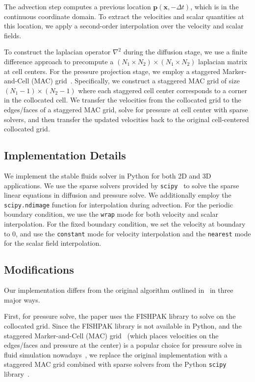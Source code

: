 \documentclass[sigconf]{acmart}
\begin{document}
The advection step computes a previous location $\mathbf{p}(\mathbf{x}, -\Delta t)$, which is in the continuous coordinate domain. To extract the velocities and scalar quantities at this location, we apply a second-order interpolation over the velocity and scalar fields.

To construct the laplacian operator $\nabla^2$ during the diffusion stage, we use a finite difference approach to precompute a $(N_1\times N_2)\times(N_1\times N_2)$ laplacian matrix at cell centers. For the pressure projection stage, we employ a staggered Marker-and-Cell (MAC) grid~\cite{harlow1965MAC}. Specifically, we construct a staggered MAC grid of size $(N_1 - 1)\times(N_2 - 1)$ where each staggered cell center corresponds to a corner in the collocated cell. We transfer the velocities from the collocated grid to the edges/faces of a staggered MAC grid, solve for pressure at cell center with sparse solvers, and then transfer the updated velocities back to the original cell-centered collocated grid.

\subsection{Implementation Details}
We implement the stable fluids solver in Python for both 2D and 3D applications. We use the sparse solvers provided by \texttt{scipy}~\cite{scipy} to solve the sparse linear equations in diffusion and pressure solve. We additionally employ the \texttt{scipy.ndimage} function for interpolation during advection. For the periodic boundary condition, we use the \texttt{wrap} mode for both velocity and scalar interpolation. For the fixed boundary condition, we set the velocity at boundary to 0, and use the \texttt{constant} mode for velocity interpolation and the \texttt{nearest} mode for the scalar field interpolation.

\subsection{Modifications}
Our implementation differs from the original algorithm outlined in~\cite{Stam1999Fluid} in three major ways.

First, for pressure solve, the paper uses the FISHPAK library to solve on the collocated grid. Since the FISHPAK library is not available in Python, and the staggered Marker-and-Cell (MAC) grid~\cite{harlow1965MAC} (which places velocities on the edges/faces and pressure at the center) is a popular choice for pressure solve in fluid simulation nowadays~\cite{Foster95realisticanimation, fluidcoupling07, variationalstokes2017, csc417fluidvideo}, we replace the original implementation with a staggered MAC grid combined with sparse solvers from the Python \texttt{scipy} library~\cite{scipy}.
\end{document}
